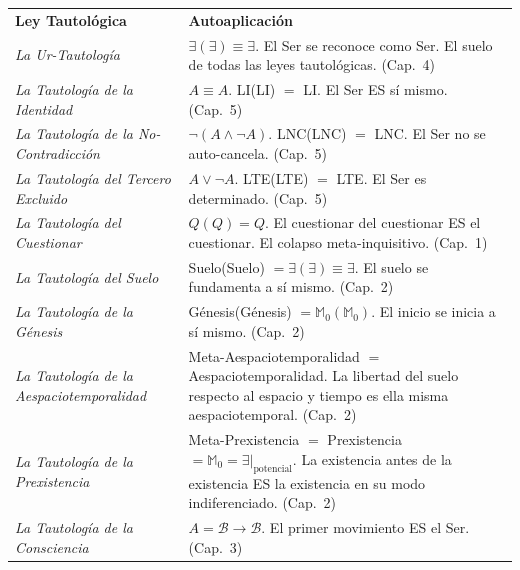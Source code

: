 \documentclass[10pt, openany, oneside]{book}
\renewcommand{\footnotesize}{\fontsize{8.5}{11}\selectfont}
\begin{document}
\vspace{0.5em}

{\footnotesize
\noindent\begin{tabular}{@{} p{} @{\hspace{0.5em}} p{} @{}}
\textbf{Ley Tautológica} & \textbf{Autoaplicación} \\[0.5em]

\textit{La Ur-Tautología} & $\exists(\exists) \equiv \exists$. El Ser se reconoce como Ser. El suelo de todas las leyes tautológicas. (Cap.\ 4) \\[0.3em]

\textit{La Tautología de la Identidad} & $A \equiv A$. LI(LI) $=$ LI. El Ser ES sí mismo. (Cap.\ 5) \\[0.3em]

\textit{La Tautología de la No-Contradicción} & $\neg(A \wedge \neg A)$. LNC(LNC) $=$ LNC. El Ser no se auto-cancela. (Cap.\ 5) \\[0.3em]

\textit{La Tautología del Tercero Excluido} & $A \vee \neg A$. LTE(LTE) $=$ LTE. El Ser es determinado. (Cap.\ 5) \\[0.3em]

\textit{La Tautología del Cuestionar} & $Q(Q) = Q$. El cuestionar del cuestionar ES el cuestionar. El colapso meta-inquisitivo. (Cap.\ 1) \\[0.3em]

\textit{La Tautología del Suelo} & Suelo(Suelo) $= \exists(\exists) \equiv \exists$. El suelo se fundamenta a sí mismo. (Cap.\ 2) \\[0.3em]

\textit{La Tautología de la Génesis} & Génesis(Génesis) $= \mathbb{M}_0(\mathbb{M}_0)$. El inicio se inicia a sí mismo. (Cap.\ 2) \\[0.3em]

\textit{La Tautología de la Aespaciotemporalidad} & Meta-Aespaciotemporalidad $=$ Aespaciotemporalidad. La libertad del suelo respecto al espacio y tiempo es ella misma aespaciotemporal. (Cap.\ 2) \\[0.3em]

\textit{La Tautología de la Prexistencia} & Meta-Prexistencia $=$ Prexistencia $= \mathbb{M}_0 = \exists|_{\text{potencial}}$. La existencia antes de la existencia ES la existencia en su modo indiferenciado. (Cap.\ 2) \\[0.3em]

\textit{La Tautología de la Consciencia} & $A = \mathcal{B} \to \mathcal{B}$. El primer movimiento ES el Ser. (Cap.\ 3) \\[0.3em]


\end{tabular}}
\end{document}
